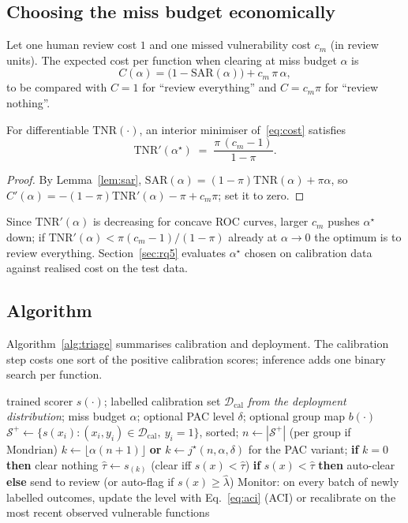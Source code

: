\subsection{Choosing the miss budget economically}
Let one human review cost $1$ and one missed vulnerability cost $c_m$ (in review units). The expected cost per function when clearing at miss budget $\alpha$ is
\begin{equation}
  C(\alpha)=\bigl(1-\mathrm{SAR}(\alpha)\bigr)+c_m\,\pi\,\alpha ,\label{eq:cost}
\end{equation}
to be compared with $C=1$ for ``review everything'' and $C=c_m\pi$ for ``review nothing''.
\begin{proposition}\label{prop:cost}
For differentiable $\mathrm{TNR}(\cdot)$, an interior minimiser of~\eqref{eq:cost} satisfies
\[
 \mathrm{TNR}'(\alpha^\star)\;=\;\frac{\pi\,(c_m-1)}{1-\pi}.
\]
\end{proposition}
\begin{proof}
By Lemma~\ref{lem:sar}, $\mathrm{SAR}(\alpha)=(1-\pi)\mathrm{TNR}(\alpha)+\pi\alpha$, so $C'(\alpha)=-(1-\pi)\mathrm{TNR}'(\alpha)-\pi+c_m\pi$; set it to zero.
\end{proof}
Since $\mathrm{TNR}'(\alpha)$ is decreasing for concave ROC curves, larger $c_m$ pushes $\alpha^\star$ down; if $\mathrm{TNR}'(\alpha)<\pi(c_m-1)/(1-\pi)$ already at $\alpha\to0$ the optimum is to review everything. Section~\ref{sec:rq5} evaluates $\alpha^\star$ chosen on calibration data against realised cost on the test data.

\subsection{Algorithm}
Algorithm~\ref{alg:triage} summarises calibration and deployment. The calibration step costs one sort of the positive calibration scores; inference adds one binary search per function.

\begin{algorithm}[t]
\caption{Risk-controlled triage (calibration and deployment)}\label{alg:triage}
\begin{algorithmic}[1]
\Require trained scorer $s(\cdot)$; labelled calibration set $\mathcal D_{\mathrm{cal}}$ \emph{from the deployment distribution}; miss budget $\alpha$; optional PAC level $\delta$; optional group map $b(\cdot)$
\State $\mathcal S^+\gets\{s(x_i): (x_i,y_i)\in\mathcal D_{\mathrm{cal}},\ y_i=1\}$, sorted; $n\gets|\mathcal S^+|$ (per group if Mondrian)
\State $k\gets\lfloor\alpha(n+1)\rfloor$ \textbf{or} $k\gets j^\star(n,\alpha,\delta)$ for the PAC variant; \textbf{if} $k=0$ \textbf{then} clear nothing
\State $\hat\tau\gets s_{(k)}$ (clear iff $s(x)<\hat\tau$)
  \State \textbf{if} $s(x)<\hat\tau$ \textbf{then} auto-clear \textbf{else} send to review (or auto-flag if $s(x)\ge\hat\lambda$)
\EndFor
\State Monitor: on every batch of newly labelled outcomes, update the level with Eq.~\eqref{eq:aci} (ACI) or recalibrate on the most recent observed vulnerable functions
\end{algorithmic}
\end{algorithm}
